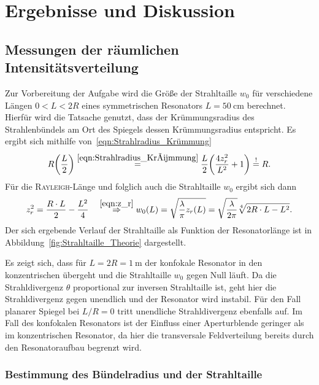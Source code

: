 \documentclass[a4paper,twoside,final]{article}
\begin{document}
\section{Ergebnisse und Diskussion}\label{sec:ErgebnisseUndDiskussion}

\subsection{Messungen der räumlichen Intensitätsverteilung}

Zur Vorbereitung der Aufgabe wird die Größe der Strahltaille $w_0$ für verschiedene Längen $0 < L < 2R$ eines symmetrischen Resonators $L = \SI{50}{\centi\metre}$ berechnet. Hierfür wird die Tatsache genutzt, dass der Krümmungsradius des Strahlenbündels am Ort des Spiegels dessen Krümmungsradius entspricht. Es ergibt sich mithilfe von~\eqref{eqn:Strahlradius_Krümmung}
\begin{align}
  R\qty(\frac{L}{2}) \overset{\eqref{eqn:Strahlradius_Krümmung} }{=} \frac{L}{2} \qty(\frac{4 z_r^2}{L^2} + 1) \overset{!}{=} R.
\end{align}
Für die \textsc{Rayleigh}-Länge und folglich auch die Strahltaille $w_0$ ergibt sich dann
\begin{align}\label{eqn:Strahltaille}
  z_r^2 = \frac{R \cdot L}{2} - \frac{L^2}{4} \quad \overset{\eqref{eqn:z_r}}{\Rightarrow} w_0(L) = \sqrt{\frac{\lambda}{\pi} z_r(L)} = \sqrt{\frac{\lambda}{2\pi}}\sqrt[4]{2 R \cdot L - L^2}.
\end{align}
Der sich ergebende Verlauf der Strahltaille als Funktion der Resonatorlänge ist in Abbildung~\ref{fig:Strahltaille_Theorie} dargestellt.



Es zeigt sich, dass für $L = 2R = \SI{1}{\metre}$ der konfokale Resonator in den konzentrischen übergeht und die Strahltaille $w_0$ gegen Null läuft. Da die Strahldivergenz $\theta$ proportional zur inversen Strahltaille ist, geht hier die Strahldivergenz gegen unendlich und der Resonator wird instabil. Für den Fall planarer Spiegel bei $L/R = 0$ tritt unendliche Strahldivergenz ebenfalls auf. Im Fall des konfokalen Resonators ist der Einfluss einer Aperturblende geringer als im konzentrischen Resonator, da hier die transversale Feldverteilung bereits durch den Resonatoraufbau begrenzt wird.

\subsubsection{Bestimmung des Bündelradius und der Strahltaille}
\end{document}

